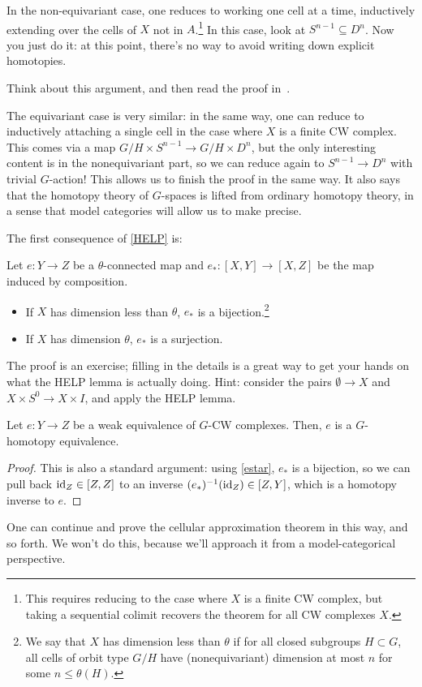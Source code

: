In the non-equivariant case, one reduces to working one cell at a time, inductively extending over the cells of $X$
not in $A$.\footnote{This requires reducing to the case where $X$ is a finite CW complex, but taking a sequential
colimit recovers the theorem for all CW complexes $X$.} In this case, look at $S^{n-1}\subseteq D^n$. Now you just
do it: at this point, there's no way to avoid writing down explicit homotopies.
\begin{ex}
Think about this argument, and then read the proof in~\cite{ConciseCourse}.
\end{ex}
The equivariant case is very similar: in the same way, one can reduce to inductively attaching a single cell in the
case where $X$ is a finite CW complex. This comes via a map $G/H\times S^{n-1}\to G/H\times D^n$, but the only
interesting content is in the nonequivariant part, so we can reduce again to $S^{n-1}\to D^n$ with trivial
$G$-action! This allows us to finish the proof in the same way. It also says that the homotopy theory of $G$-spaces
is lifted from ordinary homotopy theory, in a sense that model categories will allow us to make precise.

The first consequence of \cref{HELP} is:
\begin{thm}
\label{estar}
Let $e\colon Y\to Z$ be a $\theta$-connected map and $e_*\colon [X,Y]\to [X,Z]$ be the map induced by composition.
\begin{itemize}
	\item If $X$ has dimension less than $\theta$, $e_*$ is a bijection.\footnote{We say that $X$ has dimension
	less than $\theta$ if for all closed subgroups $H\subset G$, all cells of orbit type $G/H$ have
	(nonequivariant) dimension at most $n$ for some $n \leq \theta(H)$.}
	\item If $X$ has dimension $\theta$, $e_*$ is a surjection.
\end{itemize}
\end{thm}
The proof is an exercise; filling in the details is a great way to get your hands on what the HELP lemma is
actually doing. Hint: consider the pairs $\emptyset\to X$ and $X\times S^0\to X\times I$, and apply the HELP lemma.
\begin{cor}
\label{eqWhite}
Let $e\colon Y\to Z$ be a weak equivalence of $G$-CW complexes. Then, $e$ is a $G$-homotopy equivalence.
\end{cor}
\begin{proof}
This is also a standard argument: using \cref{estar}, $e_*$ is a bijection, so we can pull back
$\mathrm{id}_Z\in[Z,Z]$ to an inverse $(e_*)^{-1}(\mathrm{id}_Z)\in [Z,Y]$, which is a homotopy inverse to $e$.
\end{proof}
One can continue and prove the cellular approximation theorem in this way, and so forth. We won't do this, because
we'll approach it from a model-categorical perspective.

